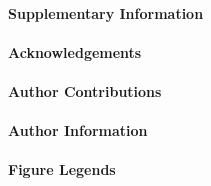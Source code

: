 \documentclass[12pt]{article}
\renewcommand\refname{References and Notes}
\begin{document}
\renewcommand{\refname}{\normalsize References}



\paragraph*{Supplementary Information}


\paragraph*{Acknowledgements}

\paragraph*{Author Contributions}

\paragraph*{Author Information}

\paragraph*{Figure Legends}~ \\
\end{document}
